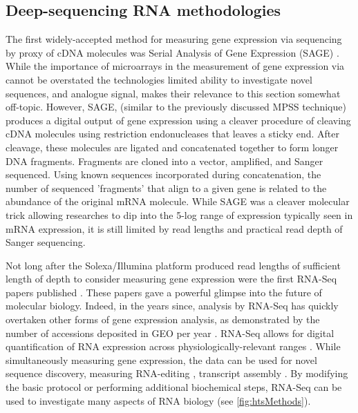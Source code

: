 \subsection{Deep-sequencing RNA methodologies}




The first widely-accepted method for measuring gene expression via sequencing by proxy of cDNA molecules was Serial Analysis of Gene Expression (SAGE) \citep{Velculescu1995a}. While the importance of microarrays in the measurement of gene expression via cannot be overstated \citep{Shendure2008,Marioni2008} the technologies limited ability to investigate novel sequences, and analogue signal, makes their relevance to this section somewhat off-topic. However, SAGE, (similar to the previously discussed MPSS technique) produces a digital output of gene expression using a cleaver procedure of cleaving cDNA molecules using restriction endonucleases that leaves a sticky end. After cleavage, these molecules are ligated and concatenated together to form longer DNA fragments. Fragments are cloned into a vector, amplified, and Sanger sequenced. Using known sequences incorporated during concatenation, the number of sequenced 'fragments' that align to a given gene is related to the abundance of the original mRNA molecule. While SAGE was a cleaver molecular trick allowing researches to dip into the 5-log range of expression typically seen in mRNA expression, it is still limited by read lengths and practical read depth of Sanger sequencing. 

Not long after the Solexa/Illumina platform produced read lengths of sufficient length of depth to consider measuring gene expression were the first RNA-Seq papers published \citep{Mortazavi2008, Nagalakshmi2008,Lister2008}. These papers gave a powerful glimpse into the future of molecular biology. Indeed, in the years since, analysis by RNA-Seq has quickly overtaken other forms of gene expression analysis, as demonstrated by the number of accessions deposited in GEO per year \citep{Barrett2013}. RNA-Seq allows for digital quantification of RNA expression across physiologically-relevant ranges \citep{Blencowe2009}. While simultaneously measuring gene expression, the data can be used for novel sequence discovery, measuring RNA-editing \citep{Li2011}, transcript assembly \citep{Trapnell2010}. By modifying the basic protocol or performing additional biochemical steps, RNA-Seq can be used to investigate many aspects of RNA biology (see \ref{fig:htsMethods}). 

